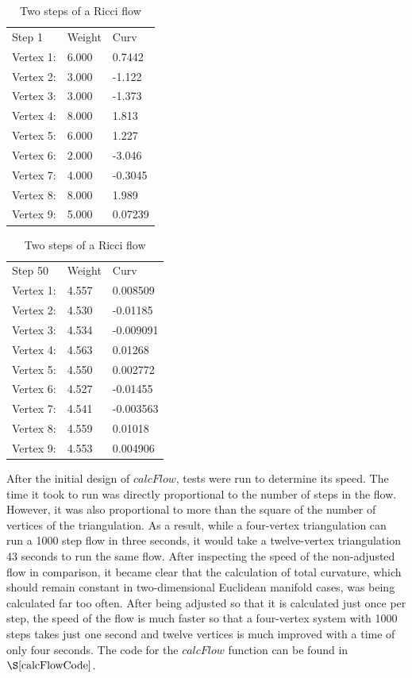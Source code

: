 \documentclass[12pt]{article}
\begin{document}
\begin{table}
\begin{center}
\begin{minipage}{2.2in}
\begin{tabular}{l|l|l}
\hline
Step 1   & Weight &  Curv\\
Vertex 1:& 6.000 & 0.7442\\
Vertex 2: &3.000 & -1.122\\
Vertex 3:& 3.000 & -1.373\\
Vertex 4:& 8.000 & 1.813\\
Vertex 5: &6.000 & 1.227\\
Vertex 6: &2.000 & -3.046\\
Vertex 7: &4.000 & -0.3045\\
Vertex 8: &8.000 & 1.989\\
Vertex 9: &5.000 & 0.07239\\ \hline
\end{tabular} 
\end{minipage}
\begin{minipage}{2.2in}
\begin{tabular}{l|l|l}
\hline
Step 50 &  Weight &  Curv\\
Vertex 1:& 4.557 & 0.008509\\
Vertex 2: &4.530 & -0.01185\\
Vertex 3: &4.534 & -0.009091\\
Vertex 4:& 4.563 & 0.01268\\
Vertex 5:& 4.550 & 0.002772\\
Vertex 6: &4.527 & -0.01455\\
Vertex 7: &4.541 & -0.003563\\
Vertex 8: &4.559 & 0.01018\\
Vertex 9: &4.553 & 0.004906\\ \hline
\end{tabular}
\end{minipage}
\end{center}
\caption{Two steps of a Ricci flow}
\label{tab:ricciSteps}
\end{table}

 After the initial design of $calcFlow$, tests were run to determine its speed. The time it took to run was directly proportional to the number of steps in the flow. However, it was also proportional to more than the square of the number of vertices of the triangulation. As a result, while a four-vertex triangulation can run a 1000 step flow in three seconds, it would take a twelve-vertex triangulation 43 seconds to run the same flow. After inspecting the speed of the non-adjusted flow in comparison, it became clear that the calculation of total curvature, which should remain constant in two-dimensional Euclidean manifold cases, was being calculated far too often. After being adjusted so that it is calculated just once per step, the speed of the flow is much faster so that a four-vertex system with 1000 steps takes just one second and twelve vertices is much improved with a time of only four seconds. The code for the $calcFlow$ function can be found in $\S\ref{calcFlowCode}$.
\end{document}
